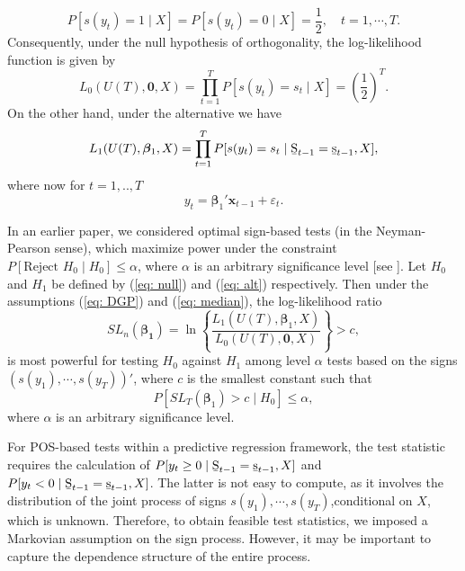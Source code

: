 \documentclass[harvard,11pt]{article}
\begin{document}
\begin{equation}
P[s(y_t)=1\mid X]=P[s(y_t)=0\mid X]=\frac{1}{2},\quad t=1,\cdots,T.
\end{equation}
Consequently, under the null hypothesis of orthogonality, the log-likelihood function is given by
\[
L_0(U(T),\bm{0},X)=\prod\limits_{t=1}^{T}P[s(y_t)=s_t\mid X]=\left(\frac{1}{2}\right)^T.
\]
On the other hand, under the alternative we have
\[
L_1(U(T),\bm{\beta}_1,X)=\prod\limits_{t=1}^{T}P[s(y_t)=s_t\mid \text{\b{S}}_{t-1}=\text{\b{s}}_{t-1}, X],
\]
where now for $t=1,..,T$
\[
y_t=\bm{\beta}_1'\bm{x}_{t-1}+\varepsilon_t.
\]

In an earlier paper, we considered optimal sign-based tests (in the Neyman-Pearson sense), which maximize power under the constraint $P[\text{Reject }  H_0\mid H_0]\leq \alpha$, where $\alpha$ is an arbitrary significance level [see \citet{lehmann2006testing}]. Let $H_0$ and $H_1$ be defined by (\ref{eq: null}) and (\ref{eq: alt}) respectively. Then under the assumptions (\ref{eq: DGP}) and (\ref{eq: median}), the log-likelihood ratio
\begin{equation}\label{eq: teststat}
SL_n(\bm{\beta_1})=\ln\left\{\frac{L_1(U(T),\bm{\beta}_1,X)}{L_0(U(T),\bm{0},X)}\right\}>c,
\end{equation} 
is most powerful for testing $H_0$ against $H_1$ among level $\alpha$ tests based on the signs $(s(y_1),\cdots,s(y_T))'$, where $c$ is the smallest constant such that 
\[
P[SL_T(\bm{\beta}_1)>c\mid H_0]\leq \alpha,
\]
where $\alpha$ is an arbitrary significance level.

 For POS-based tests within a predictive regression framework, the test statistic requires the calculation of $P[y_t\geq0\mid\text{\b{S}}_{t-1}=\text{\b{s}}_{t-1},X]$ and $P[y_t<0\mid\text{\b{S}}_{t-1}=\text{\b{s}}_{t-1},X]$. The latter is not easy to compute, as it involves the distribution of the joint process of signs  $s(y_1),\cdots,s(y_T)$,conditional on $X$, which is unknown. Therefore, to obtain feasible test statistics, we imposed a Markovian assumption on the sign process. However, it may be important to capture the dependence structure of the entire process.
\end{document}
